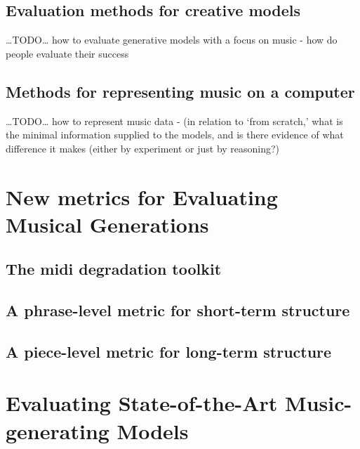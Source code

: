 \documentclass[12pt,a4paper,]{report}
\begin{document}
\hypertarget{evaluation-methods-for-creative-models}{%
\section{Evaluation methods for creative
models}\label{evaluation-methods-for-creative-models}}

\ldots TODO\ldots{} how to evaluate generative models with a focus on
music - how do people evaluate their success

\hypertarget{methods-for-representing-music-on-a-computer}{%
\section{Methods for representing music on a
computer}\label{methods-for-representing-music-on-a-computer}}

\ldots TODO\ldots{} how to represent music data - (in relation to `from
scratch,' what is the minimal information supplied to the models, and is
there evidence of what difference it makes (either by experiment or just
by reasoning?)

\hypertarget{new-metrics-for-evaluating-musical-generations}{%
\chapter{New metrics for Evaluating Musical
Generations}\label{new-metrics-for-evaluating-musical-generations}}

\hypertarget{the-midi-degradation-toolkit}{%
\section{The midi degradation
toolkit}\label{the-midi-degradation-toolkit}}

\hypertarget{a-phrase-level-metric-for-short-term-structure}{%
\section{A phrase-level metric for short-term
structure}\label{a-phrase-level-metric-for-short-term-structure}}

\hypertarget{a-piece-level-metric-for-long-term-structure}{%
\section{A piece-level metric for long-term
structure}\label{a-piece-level-metric-for-long-term-structure}}

\hypertarget{evaluating-state-of-the-art-music-generating-models}{%
\chapter{Evaluating State-of-the-Art Music-generating
Models}\label{evaluating-state-of-the-art-music-generating-models}}
\end{document}
